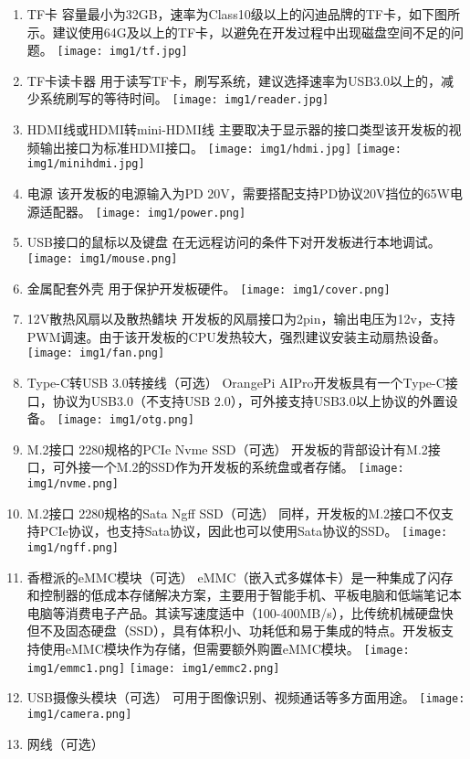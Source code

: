 \begin{enumerate}
\def\labelenumi{\arabic{enumi}.}
\item
  TF卡
  容量最小为32GB，速率为Class10级以上的闪迪品牌的TF卡，如下图所示。建议使用64G及以上的TF卡，以避免在开发过程中出现磁盘空间不足的问题。
  \texttt{[image: img1/tf.jpg]}
\item
  TF卡读卡器
  用于读写TF卡，刷写系统，建议选择速率为USB3.0以上的，减少系统刷写的等待时间。
  \texttt{[image: img1/reader.jpg]}
\item
  HDMI线或HDMI转mini-HDMI线
  主要取决于显示器的接口类型该开发板的视频输出接口为标准HDMI接口。
  \texttt{[image: img1/hdmi.jpg]} \texttt{[image: img1/minihdmi.jpg]}
\item
  电源 该开发板的电源输入为PD
  20V，需要搭配支持PD协议20V挡位的65W电源适配器。
  \texttt{[image: img1/power.png]}
\item
  USB接口的鼠标以及键盘 在无远程访问的条件下对开发板进行本地调试。
  \texttt{[image: img1/mouse.png]}
\item
  金属配套外壳 用于保护开发板硬件。 \texttt{[image: img1/cover.png]}
\item
  12V散热风扇以及散热鳍块
  开发板的风扇接口为2pin，输出电压为12v，支持PWM调速。由于该开发板的CPU发热较大，强烈建议安装主动扇热设备。
  \texttt{[image: img1/fan.png]}
\item
  Type-C转USB 3.0转接线（可选） OrangePi
  AIPro开发板具有一个Type-C接口，协议为USB3.0（不支持USB
  2.0），可外接支持USB3.0以上协议的外置设备。
  \texttt{[image: img1/otg.png]}
\item
  M.2接口 2280规格的PCIe Nvme SSD（可选）
  开发板的背部设计有M.2接口，可外接一个M.2的SSD作为开发板的系统盘或者存储。
  \texttt{[image: img1/nvme.png]}
\item
  M.2接口 2280规格的Sata Ngff SSD（可选）
  同样，开发板的M.2接口不仅支持PCIe协议，也支持Sata协议，因此也可以使用Sata协议的SSD。
  \texttt{[image: img1/ngff.png]}
\item
  香橙派的eMMC模块（可选）
  eMMC（嵌入式多媒体卡）是一种集成了闪存和控制器的低成本存储解决方案，主要用于智能手机、平板电脑和低端笔记本电脑等消费电子产品。其读写速度适中（100-400MB/s），比传统机械硬盘快但不及固态硬盘（SSD），具有体积小、功耗低和易于集成的特点。开发板支持使用eMMC模块作为存储，但需要额外购置eMMC模块。
  \texttt{[image: img1/emmc1.png]} \texttt{[image: img1/emmc2.png]}
\item
  USB摄像头模块（可选） 可用于图像识别、视频通话等多方面用途。
  \texttt{[image: img1/camera.png]}
\item
  网线（可选）

\end{enumerate}
